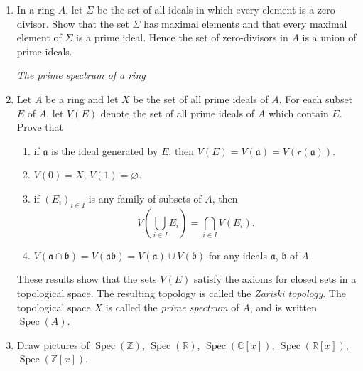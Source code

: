 \begin{enumerate}
Let $\mathfrak m$ be a maximal ideal of $A$ containing $\mathfrak a$, and let $K_1=A/\mathfrak m$. Then $K_1$ is an extension field of $K$ in which each $f\in\Sigma$ has a root. Repeat the construction with $K_1$ in place of $K$, obtaining a field $K_2$, and so on. Let $L=\bigcup_{n=1}^\infty K_n$. Then $L$ is a field in which each $f\in\Sigma$ splits completely into linear factors. Let $\overline K$ be the set of all elements of $L$ which are algebraic over $K$. Then $\overline K$ is an algebraic closure of $K$.

\item In a ring $A$, let $\Sigma$ be the set of all ideals in which every element is a zero-divisor. Show that the set $\Sigma$ has maximal elements and that every maximal element of $\Sigma$ is a prime ideal. Hence the set of zero-divisors in $A$ is a union of prime ideals.

\noindent\textit{The prime spectrum of a ring}

\item Let $A$ be a ring and let $X$ be the set of all prime ideals of $A$. For each subset $E$ of $A$, let $V(E)$ denote the set of all prime ideals of $A$ which contain $E$. Prove that
\begin{enumerate}
\renewcommand{\labelenumii}{\roman{enumii})}
\item if $\mathfrak a$ is the ideal generated by $E$, then $V(E)=V(\mathfrak a)=V(r(\mathfrak a))$.
\item $V(0)=X$, $V(1)=\varnothing$.
\item if $(E_i)_{i\in I}$ is any family of subsets of $A$, then
\[
 V\left(\bigcup_{i\in I}E_i\right)=\bigcap_{i\in I}V(E_i).
\]
\item $V(\mathfrak a\cap\mathfrak b)=V(\mathfrak a\mathfrak b)=V(\mathfrak a)\cup V(\mathfrak b)$ for any ideals $\mathfrak a$, $\mathfrak b$ of $A$.
\end{enumerate}
These results show that the sets $V(E)$ satisfy the axioms for closed sets in a topological space. The resulting topology is called the \textit{Zariski topology}. The topological space $X$ is called the \textit{prime spectrum} of $A$, and is written $\operatorname{Spec}(A)$.

\item Draw pictures of $\operatorname{Spec}(\mathbb Z)$, $\operatorname{Spec}(\mathbb R)$, $\operatorname{Spec}(\mathbb C[x])$, $\operatorname{Spec}(\mathbb R[x])$, $\operatorname{Spec}(\mathbb Z[x])$.


\end{enumerate}
